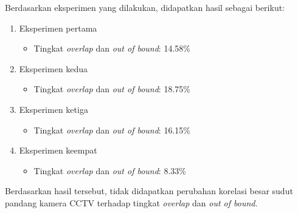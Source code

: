 Berdasarkan eksperimen yang dilakukan, didapatkan hasil sebagai berikut:
\begin{enumerate}
	\item Eksperimen pertama
	\begin{itemize}
		\item Tingkat \textit{overlap} dan \textit{out of bound}: 14.58\%
	\end{itemize}
		
	\item Eksperimen kedua
	\begin{itemize}
		\item Tingkat \textit{overlap} dan \textit{out of bound}: 18.75\%
	\end{itemize}
	
	\item Eksperimen ketiga
	\begin{itemize}
		\item Tingkat \textit{overlap} dan \textit{out of bound}: 16.15\%
	\end{itemize}
	\item Eksperimen keempat
	\begin{itemize}
		\item Tingkat \textit{overlap} dan \textit{out of bound}: 8.33\%
	\end{itemize}
\end{enumerate}
Berdasarkan hasil tersebut, tidak didapatkan perubahan korelasi besar sudut pandang kamera CCTV terhadap tingkat \textit{overlap} dan \textit{out of bound}.




















